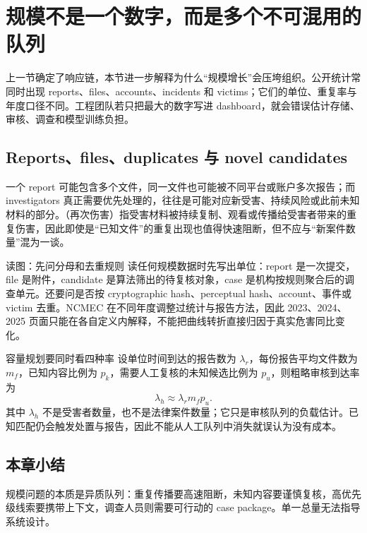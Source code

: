 \section{规模不是一个数字，而是多个不可混用的队列}

上一节确定了响应链，本节进一步解释为什么“规模增长”会压垮组织。公开统计常同时出现 reports、files、accounts、incidents 和 victims；它们的单位、重复率与年度口径不同。工程团队若只把最大的数字写进 dashboard，就会错误估计存储、审核、调查和模型训练负担。

\subsection{Reports、files、duplicates 与 novel candidates}

一个 report 可能包含多个文件，同一文件也可能被不同平台或账户多次报告；而 investigators 真正需要优先处理的，往往是可能对应新受害、持续风险或此前未知材料的部分。（再次伤害）指受害材料被持续复制、观看或传播给受害者带来的重复伤害，因此即使是“已知文件”的重复出现也值得快速阻断，但不应与“新案件数量”混为一谈。


\begin{knowledgebox}{读图：先问分母和去重规则}
读任何规模数据时先写出单位：report 是一次提交，file 是附件，candidate 是算法筛出的待复核对象，case 是机构按规则聚合后的调查单元。还要问是否按 cryptographic hash、perceptual hash、account、事件或 victim 去重。NCMEC 在不同年度调整过统计与报告方法，因此 2023、2024、2025 页面只能在各自定义内解释，不能把曲线转折直接归因于真实危害同比变化。
\end{knowledgebox}

\begin{importantbox}{容量规划要同时看四种率}
设单位时间到达的报告数为 $\lambda_r$，每份报告平均文件数为 $m_f$，已知内容比例为 $p_k$，需要人工复核的未知候选比例为 $p_u$，则粗略审核到达率为
\[
\lambda_h \approx \lambda_r m_f p_u.
\]
其中 $\lambda_h$ 不是受害者数量，也不是法律案件数量；它只是审核队列的负载估计。已知匹配仍会触发处置与报告，因此不能从人工队列中消失就误认为没有成本。
\end{importantbox}


\subsection{本章小结}

规模问题的本质是异质队列：重复传播要高速阻断，未知内容要谨慎复核，高优先级线索要携带上下文，调查人员则需要可行动的 case package。单一总量无法指导系统设计。

